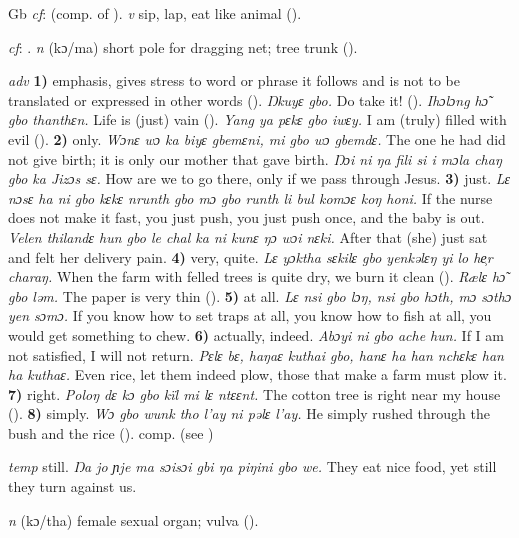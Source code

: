 \begin{letter}{Gb}
 \textit{cf}:  (comp. of ). \textit{v} sip, lap, eat like animal (\citealt{Pichl1967}). 

 \textit{cf}: . \textit{n} (kɔ/ma) short pole for dragging net; tree trunk (\citealt{Pichl1967}).

 \textit{adv} \textbf{1)} emphasis, gives stress to word or phrase it follows and is not to be translated or expressed in other words (\citealt{Pichl1967}). \textit{Ŋkuyɛ gbo.} Do take it! (\citealt{Pichl1967}). \textit{Ihɔlɔng hɔ̃ gbo thanthɛn.} Life is (just) vain (\citealt{Pichl1967}). \textit{Yang ya pɛkɛ gbo iwɛy.} I am (truly) filled with evil (\citealt{Pichl1967}). \textbf{2)} only. \textit{Wɔnɛ wɔ ka biyɛ gbemɛni, mi gbo wɔ gbemdɛ.} The one he had did not give birth; it is only our mother that gave birth. \textit{Ŋɔi ni ŋa fili si i mɔla chaŋ gbo ka Jizɔs sɛ.} How are we to go there, only if we pass through Jesus. \textbf{3)} just. \textit{Lɛ nɔsɛ ha ni gbo kɛkɛ nrunth gbo mɔ gbo runth li bul komɔɛ koŋ honi.} If the nurse does not make it fast, you just push, you just push once, and the baby is out. \textit{Velen thilandɛ hun gbo le chal ka ni kunɛ ŋɔ wɔi nɛki.} After that (she) just sat and felt her delivery pain. \textbf{4)} very, quite. \textit{Lɛ yɔktha sɛkilɛ gbo yenkəlɛŋ yi lo he̹r charaŋ.} When the farm with felled trees is quite dry, we burn it clean (\citealt{Pichl1967}). \textit{Rælɛ hɔ̃ gbo ləm.} The paper is very thin (\citealt{Pichl1967}). \textbf{5)} at all. \textit{Lɛ nsi gbo lɔŋ, nsi gbo hɔth, mɔ sɔthɔ yen sɔmɔ.} If you know how to set traps at all, you know how to fish at all, you would get something to chew. \textbf{6)} actually, indeed. \textit{Abɔyi ni gbo ache hun.} If I am not satisfied, I will not return. \textit{Pɛlɛ bɛ, haŋaɛ kuthai gbo, hanɛ ha han nchɛkɛ han ha kuthaɛ.} Even rice, let them indeed plow, those that make a farm must plow it. \textbf{7)} right. \textit{Poloŋ dɛ kɔ gbo kïl mi lɛ ntɛɛnt.} The cotton tree is right near my house (\citealt{Pichl1967}). \textbf{8)} simply. \textit{Wɔ gbo wunk tho l'ay ni pəlɛ l'ay.} He simply rushed through the bush and the rice (\citealt{Pichl1967}). comp.  (see ) 

 \textit{temp} still. \textit{Ŋa jo ɲje ma sɔisɔi gbi ŋa piŋini gbo we.} They eat nice food, yet still they turn against us.

 \textit{n} (kɔ/tha) female sexual organ; vulva (\citealt{Pichl1967}).


\end{letter}
